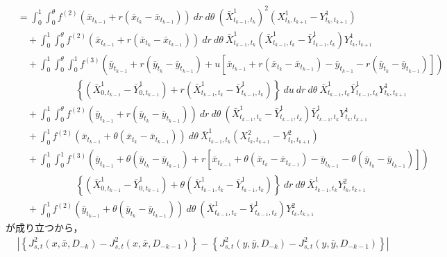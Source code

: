 \begin{prf}
\begin{description}
\begin{align}
					&= \int_0^1 \int_0^{\theta} f^{(2)}(\bar{x}_{t_{k-1}} + r(\bar{x}_{t_k} - \bar{x}_{t_{k-1}}))\ dr\ d\theta\ \left(\bar{X}^1_{t_{k-1},t_k}\right)^2 \left( X^1_{t_k,t_{k+1}} - Y^1_{t_k,t_{k+1}} \right) \\
						&\quad + \int_0^1 \int_0^{\theta} f^{(2)}(\bar{x}_{t_{k-1}} + r(\bar{x}_{t_k} - \bar{x}_{t_{k-1}}))\ dr\ d\theta\ \bar{X}^1_{t_{k-1},t_k} \left(\bar{X}^1_{t_{k-1},t_k} - \bar{Y}^1_{t_{k-1},t_k}\right) Y^1_{t_k,t_{k+1}} \\
						&\quad + \int_0^1 \int_0^{\theta} \int_0^1 f^{(3)} \left(\bar{y}_{t_{k-1}} + r(\bar{y}_{t_k} - \bar{y}_{t_{k-1}}) + u\left[ \bar{x}_{t_{k-1}} + r(\bar{x}_{t_k} - \bar{x}_{t_{k-1}}) - \bar{y}_{t_{k-1}} - r(\bar{y}_{t_k} - \bar{y}_{t_{k-1}})\right] \right) \\
							&\qquad \qquad \qquad \left\{ \left( \bar{X}^1_{0,t_{k-1}} - \bar{Y}^1_{0,t_{k-1}} \right) + r\left( \bar{X}^1_{t_{k-1},t_k} - \bar{Y}^1_{t_{k-1},t_k} \right) \right\}\ du\ dr\ d\theta\ \bar{X}^1_{t_{k-1},t_k} \bar{Y}^1_{t_{k-1},t_k} Y^1_{t_k,t_{k+1}} \\
						&\quad + \int_0^1 \int_0^{\theta} f^{(2)}(\bar{y}_{t_{k-1}} + r(\bar{y}_{t_k} - \bar{y}_{t_{k-1}}))\ dr\ d\theta\ \left( \bar{X}^1_{t_{k-1},t_k} - \bar{Y}^1_{t_{k-1},t_k} \right) \bar{Y}^1_{t_{k-1},t_k} Y^1_{t_k,t_{k+1}} \\
						&\quad + \int_0^1 f^{(2)}(\bar{x}_{t_{k-1}} + \theta(\bar{x}_{t_k} - \bar{x}_{t_{k-1}}))\ d\theta\ \bar{X}^1_{t_{k-1},t_k} \left( X^2_{t_k,t_{k+1}} - Y^2_{t_k,t_{k+1}} \right) \\
						&\quad + \int_0^1 \int_0^1 f^{(3)} \left(\bar{y}_{t_{k-1}} + \theta(\bar{y}_{t_k} - \bar{y}_{t_{k-1}}) + r\left[ \bar{x}_{t_{k-1}} + \theta(\bar{x}_{t_k} - \bar{x}_{t_{k-1}}) - \bar{y}_{t_{k-1}} - \theta(\bar{y}_{t_k} - \bar{y}_{t_{k-1}})\right] \right) \\
							&\qquad \qquad \qquad \left\{ \left( \bar{X}^1_{0,t_{k-1}} - \bar{Y}^1_{0,t_{k-1}} \right) + \theta\left( \bar{X}^1_{t_{k-1},t_k} - \bar{Y}^1_{t_{k-1},t_k} \right) \right\}\ dr\ d\theta\ \bar{X}^1_{t_{k-1},t_k} Y^2_{t_k,t_{k+1}} \\
						&\quad + \int_0^1 f^{(2)}(\bar{y}_{t_{k-1}} + \theta(\bar{y}_{t_k} - \bar{y}_{t_{k-1}}))\ d\theta\ \left(\bar{X}^1_{t_{k-1},t_k} - \bar{Y}^1_{t_{k-1},t_k}\right) Y^2_{t_k,t_{k+1}}
				\end{align}
				が成り立つから，
				\begin{align}
					&\left| \left\{ J^2_{s,t}(x,\bar{x},D_{-k}) - J^2_{s,t}(x,\bar{x},D_{-k-1}) \right\} - \left\{ J^2_{s,t}(y,\bar{y},D_{-k}) - J^2_{s,t}(y,\bar{y},D_{-k-1}) \right\} \right| \\

\end{align}
\end{description}
\end{prf}
